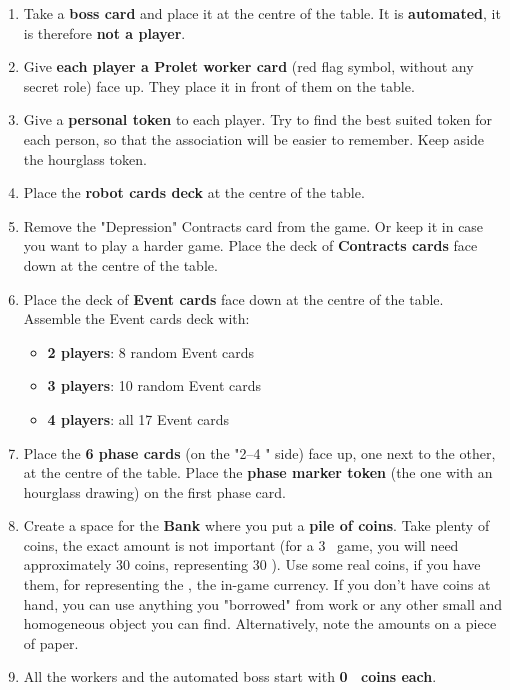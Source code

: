     \begin{enumerate}
        \item Take a \textbf{boss card} and place it at the centre of the table. It is \textbf{automated}, it is
        therefore \textbf{not a player}.
        \item Give \textbf{each player a Prolet worker card} (red flag symbol, without any secret
        role) face up. They place it in front of them on the table.
        \item Give a \textbf{personal token} to each player. Try to find the best suited token for
        each person, so that the association will be easier to remember. Keep aside
        the hourglass token.
        \item Place the \textbf{robot cards deck} at the centre of the table.
        \item Remove the "Depression" Contracts card from the game. Or keep it in case
        you want to play a harder game. Place the deck of \textbf{Contracts cards} face
        down at the centre of the table.
        \item Place the deck of \textbf{Event cards} face down at the centre of the table. Assemble
        the Event cards deck with:
        \begin{itemize}
            \item \textbf{2 players}: 8 random Event cards
            \item \textbf{3 players}: 10 random Event cards
            \item \textbf{4 players}: all 17 Event cards
        \end{itemize}
        \item Place the \textbf{6 phase cards} (on the "2–4 \faPeopleGroup" side) face up, one next to the other,
        at the centre of the table. Place the \textbf{phase marker token} (the one with an
        hourglass drawing) on the first phase card.
        \item Create a space for the \textbf{Bank} where you put a \textbf{pile of coins}. Take plenty of
        coins, the exact amount is not important (for a 3 \faPeopleGroup\ game, you will need approximately
        30 coins, representing 30 \faRubleSign). Use some real coins, if you have
        them, for representing the \faRubleSign, the in-game currency. If you don't have coins
        at hand, you can use anything you "borrowed" from work or any other small
        and homogeneous object you can find. Alternatively, note the amounts on
        a piece of paper.
        \item All the workers and the automated boss start with \textbf{0 \faRubleSign\ coins each}.
    \end{enumerate}



